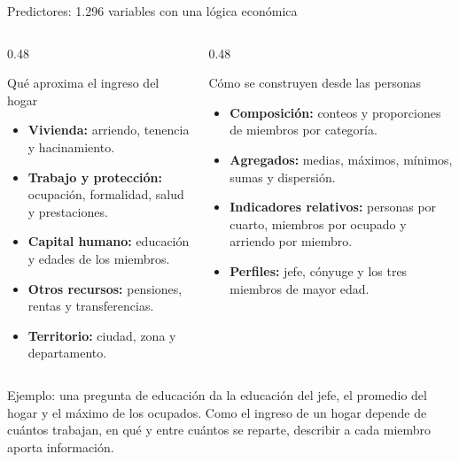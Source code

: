 \documentclass[aspectratio=169, 10pt]{beamer}
\begin{document}
\begin{frame}{Predictores: 1.296 variables con una l\'ogica econ\'omica}
  \vspace{2mm}
  \begin{columns}[T, onlytextwidth]
    \begin{column}{0.48\textwidth}
      \begin{block}{Qu\'e aproxima el ingreso del hogar}
        \footnotesize
        \begin{itemize}\setlength{\itemsep}{2pt}
          \item \textbf{Vivienda:} arriendo, tenencia y hacinamiento.
          \item \textbf{Trabajo y protecci\'on:} ocupaci\'on, formalidad, salud y prestaciones.
          \item \textbf{Capital humano:} educaci\'on y edades de los miembros.
          \item \textbf{Otros recursos:} pensiones, rentas y transferencias.
          \item \textbf{Territorio:} ciudad, zona y departamento.
        \end{itemize}
      \end{block}
    \end{column}
    \begin{column}{0.48\textwidth}
      \begin{block}{C\'omo se construyen desde las personas}
        \footnotesize
        \begin{itemize}\setlength{\itemsep}{2pt}
          \item \textbf{Composici\'on:} conteos y proporciones de miembros por categor\'ia.
          \item \textbf{Agregados:} medias, m\'aximos, m\'inimos, sumas y dispersi\'on.
          \item \textbf{Indicadores relativos:} personas por cuarto, miembros por ocupado y arriendo por miembro.
          \item \textbf{Perfiles:} jefe, c\'onyuge y los tres miembros de mayor edad.
        \end{itemize}
      \end{block}
    \end{column}
  \end{columns}
  \vspace{2mm}
  {\footnotesize Ejemplo: una pregunta de educaci\'on da la educaci\'on del jefe, el promedio del hogar y el m\'aximo de los ocupados. Como el ingreso de un hogar depende de cu\'antos trabajan, en qu\'e y entre cu\'antos se reparte, describir a cada miembro aporta informaci\'on.\par}
\end{frame}
\end{document}
